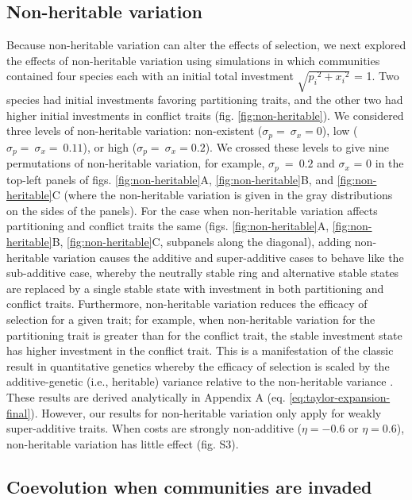 \subsection*{Non-heritable variation}

Because non-heritable variation can alter the effects of selection, we next
explored the effects of non-heritable variation using simulations in
which communities contained four species each with an initial total
investment $\sqrt{{p_{i}}^{2} + {x_{i}}^{2}}$ = 1. Two species had
initial investments favoring partitioning traits, and the other two had
higher initial investments in conflict traits (fig. \ref{fig:non-heritable}). We considered
three levels of non-heritable variation: non-existent
($\sigma_{p} = \ \sigma_{x} = 0$), low
($\sigma_{p} = \ \sigma_{x} = \ 0.11$), or high
($\sigma_{p} = \ \sigma_{x} = 0.2$). We crossed these levels to give
nine permutations of non-heritable variation, for example,
$\sigma_{p}\  = \ 0.2$ and $\sigma_{x}$ = 0 in the top-left panels
of figs. \ref{fig:non-heritable}A, \ref{fig:non-heritable}B, and \ref{fig:non-heritable}C (where the non-heritable variation is given in the
gray distributions on the sides of the panels). For the case when
non-heritable variation affects partitioning and conflict traits the same
(figs. \ref{fig:non-heritable}A, \ref{fig:non-heritable}B, \ref{fig:non-heritable}C, subpanels along the diagonal),  adding non-heritable variation causes the additive and super-additive cases to behave like the sub-additive case, whereby the neutrally stable ring and alternative stable states are replaced by a single stable state with investment in both partitioning and conflict traits. Furthermore, non-heritable variation reduces the efficacy of selection for a given trait; for example, when non-heritable variation for the partitioning trait is greater than for the conflict trait, the stable investment state has higher investment in the conflict trait. This is a manifestation of the classic result in quantitative genetics whereby the efficacy of selection is scaled by the additive-genetic (i.e., heritable) variance relative to the non-heritable variance 
\citep{Fisher1930a, Wright1931b, Barton2017}.
These results are derived analytically
in Appendix A (eq. \ref{eq:taylor-expansion-final}).
However, our results for non-heritable variation only apply for 
weakly super-additive traits. When costs are
strongly non-additive ($\eta = - 0.6$ or $\eta = 0.6$), non-heritable
variation has little effect (fig. S3).

\subsection*{Coevolution when communities are invaded}


